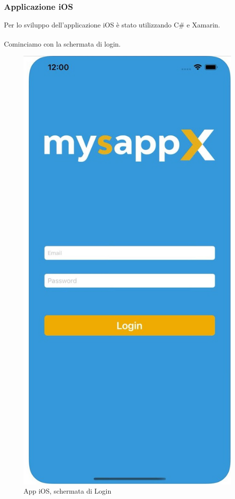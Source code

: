 \subsubsection{Applicazione iOS}
Per lo sviluppo dell'applicazione iOS è stato utilizzando C\# e Xamarin.\\\\
Cominciamo con la schermata di login.\\
\begin{figure}[!h] 
	\centering 
	\includegraphics[scale = 0.2]{immagini/app iOS/login-iOS.jpeg} 
	\caption {App iOS, schermata di Login}
	\label{fig:2-14}
\end{figure}
